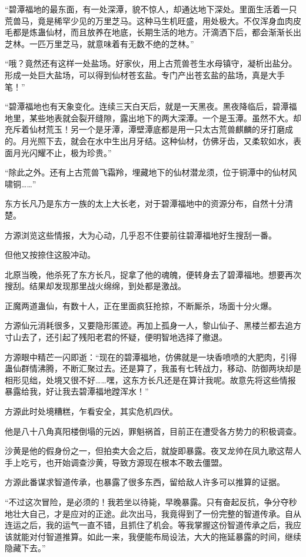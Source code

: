 \begin{this_body}
“碧潭福地的最东面，有一处深潭，貌不惊人，却通达地下深处。里面生活着一只荒兽马，竟是稀罕少见的万里芝马。这种马生机旺盛，用处极大。不仅浑身血肉皮毛都是炼蛊仙材，而且放养在地底，长期生活的地方。汗滴洒下后，都会渐渐长出芝林。一匹万里芝马，就意味着有无数不绝的芝林。”

“哦？竟然还有这样一处盐场。好家伙，用上古荒兽苍生水母镇守，凝析出盐分。形成一处巨大盐场，可以得到仙材苍玄盐。专门产出苍玄盐的盐场，真是大手笔！”

“碧潭福地也有天象变化。连续三天白天后，就是一天黑夜。黑夜降临后，碧潭福地里，某些地表就会裂开缝隙，露出地下的两大深潭。一个是玉潭。虽然不大。却充斥着仙材荒玉！另一个是牙潭，潭壁潭底都是用一只太古荒兽麒麟的牙打磨成的。月光照下去，就会在水中生出月牙结。这种仙材，仿佛牙齿，又柔软如水，表面月光闪耀不止，极为珍贵。”

“除此之外。还有上古荒兽飞霜羚，埋藏地下的仙材潜龙须，位于铜潭中的仙材风啸铜……”

东方长凡乃是东方一族的太上大长老，对于碧潭福地中的资源分布，自然十分清楚。

方源浏览这些情报，大为心动，几乎忍不住要前往碧潭福地好生搜刮一番。

但他又按捺住这股冲动。

北原当晚，他杀死了东方长凡，捉拿了他的魂魄，便转身去了碧潭福地。想要再次搜刮。结果却发现那里战火绵绵，到处都是激战。

正魔两道蛊仙，有数十人，正在里面疯狂抢掠，不断厮杀，场面十分火爆。

方源仙元消耗很多，又要隐形匿迹。再加上孤身一人，黎山仙子、黑楼兰都去追方寸山去了，还引起了残阳老君的怀疑，便明智地选择了撤退。

方源眼中精芒一闪即逝：“现在的碧潭福地，仿佛就是一块香喷喷的大肥肉，引得蛊仙群情沸腾，不断汇聚过去。还是算了，我虽有七转战力，移动、防御两块却是相形见绌，处境又很不好……嘿，这东方长凡还是在算计我呢。故意先将这些情报暴露给我，好让我去碧潭福地蹚浑水！”

方源此时处境糟糕，乍看安全，其实危机四伏。

他是八十八角真阳楼倒塌的元凶，罪魁祸首，目前正在遭受各方势力的积极调查。

沙黄是他的假身份之一，但拍卖大会之后，就旋即暴露。夜叉龙帅在凤九歌这帮人手上吃亏，也开始调查沙黄，导致方源现在根本不敢去僵盟。

方源此番谋求智道传承，也暴露了很多东西，留给敌人许多可以推算的证据。

“不过这次冒险，是必须的！我若坐以待毙，早晚暴露。只有奋起反抗，争分夺秒地壮大自己，才是应对的正途。此次出马，我竟得到了一份完整的智道传承。自从连运之后，我的运气一直不错，且抓住了机会。等我掌握这份智道传承之后，我应该就能对付智道推算。如此一来，我便能布局设法，大大的拖延暴露的时间，继续隐藏下去。”


\end{this_body}
